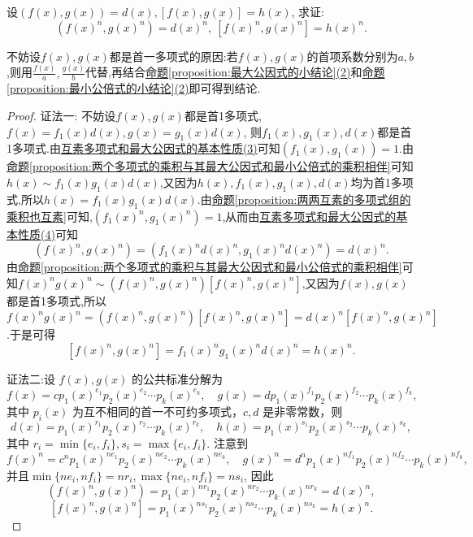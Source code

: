 \documentclass[../../main.tex]{subfiles}%
\begin{document}
\begin{proposition}[最大公因式与最小公倍式在开方下不变]\label{proposition:两个多项式的最大公因式与最小公倍式的n次方就是它们n次方的最大公因式与最小公倍式}
设\((f(x),g(x)) = d(x), [f(x),g(x)] = h(x)\), 求证:
\[
(f(x)^n,g(x)^n)=d(x)^n, \ [f(x)^n,g(x)^n]=h(x)^n.
\]
\end{proposition}
\begin{remark}
不妨设\(f(x),g(x)\)都是首一多项式的原因:若$f(x),g(x)$的首项系数分别为$a,b$,则用$\frac{f(x)}{a},\frac{g(x)}{b}$代替,再结合\hyperref[proposition:最大公因式的小结论]{命题\ref{proposition:最大公因式的小结论}(2)}和\hyperref[proposition:最小公倍式的小结论]{命题\ref{proposition:最小公倍式的小结论}(2)}即可得到结论.
\end{remark}
\begin{proof}

{\color{blue}证法一:}
不妨设\(f(x),g(x)\)都是首1多项式, \(f(x)=f_1(x)d(x), g(x)=g_1(x)d(x)\), 则$f_1(x),g_1(x),d(x)$都是首1多项式.由\hyperref[proposition:互素多项式和最大公因式的基本性质]{互素多项式和最大公因式的基本性质(3)}可知\((f_1(x),g_1(x)) = 1\).由\hyperref[proposition:两个多项式的乘积与其最大公因式和最小公倍式的乘积相伴]{命题\ref{proposition:两个多项式的乘积与其最大公因式和最小公倍式的乘积相伴}}可知\(h(x)\sim f_1(x)g_1(x)d(x)\),又因为$h(x),f_1(x),g_1(x),d(x)$均为首1多项式,所以\(h(x)=f_1(x)g_1(x)d(x)\).由\hyperref[proposition:两两互素的多项式组的乘积也互素]{命题\ref{proposition:两两互素的多项式组的乘积也互素}}可知,\((f_1(x)^n,g_1(x)^n)=1\),从而由\hyperref[proposition:互素多项式和最大公因式的基本性质]{互素多项式和最大公因式的基本性质(4)}可知
\[
(f(x)^n,g(x)^n)=(f_1(x)^nd(x)^n,g_1(x)^nd(x)^n)=d(x)^n.
\]
由\hyperref[proposition:两个多项式的乘积与其最大公因式和最小公倍式的乘积相伴]{命题\ref{proposition:两个多项式的乘积与其最大公因式和最小公倍式的乘积相伴}}可知\(f(x)^ng(x)^n\sim (f(x)^n,g(x)^n)[f(x)^n,g(x)^n]\),又因为$f(x),g(x)$都是首1多项式,所以\(f(x)^ng(x)^n=(f(x)^n,g(x)^n)[f(x)^n,g(x)^n]=d(x)^n[f(x)^n,g(x)^n]\).于是可得
\[
[f(x)^n,g(x)^n]=f_1(x)^ng_1(x)^nd(x)^n=h(x)^n.
\]

{\color{blue}证法二:}设 \(f(x), g(x)\) 的公共标准分解为
\[
f(x) = cp_1(x)^{e_1}p_2(x)^{e_2} \cdots p_k(x)^{e_k}, \quad g(x) = dp_1(x)^{f_1}p_2(x)^{f_2} \cdots p_k(x)^{f_k},
\]
其中 \(p_i(x)\) 为互不相同的首一不可约多项式，\(c, d\) 是非零常数，则
\[
d(x) = p_1(x)^{r_1}p_2(x)^{r_2} \cdots p_k(x)^{r_k}, \quad h(x) = p_1(x)^{s_1}p_2(x)^{s_2} \cdots p_k(x)^{s_k},
\]
其中 \(r_i = \min\{e_i, f_i\}, s_i = \max\{e_i, f_i\}\). 注意到
\[
f(x)^n = c^n p_1(x)^{ne_1}p_2(x)^{ne_2} \cdots p_k(x)^{ne_k}, \quad g(x)^n = d^n p_1(x)^{nf_1}p_2(x)^{nf_2} \cdots p_k(x)^{nf_k},
\]
并且\(\min\{ne_i, nf_i\} = nr_i, \max\{ne_i, nf_i\} = ns_i\), 因此
\[
(f(x)^n, g(x)^n) = p_1(x)^{nr_1}p_2(x)^{nr_2} \cdots p_k(x)^{nr_k} = d(x)^n,
\]
\[
[f(x)^n, g(x)^n] = p_1(x)^{ns_1}p_2(x)^{ns_2} \cdots p_k(x)^{ns_k} = h(x)^n.
\]

\end{proof}
\end{document}
